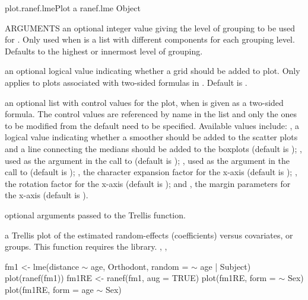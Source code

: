 \documentclass[pdftex]{article} \usepackage{url,graphicx}
\renewcommand{\Twiddle}{\mbox{\(\sim\)}}
\begin{document}
\begin{Helpfile}{plot.ranef.lme}{Plot a ranef.lme Object}
\begin{Argument}{ARGUMENTS}
an optional integer value giving the level of grouping
to be used for . Only used when  is a list
with different components for each grouping level. Defaults to the
highest or innermost level of grouping.
\item[\Co{grid:}]
an optional logical value indicating whether a grid should
be added to plot. Only applies to plots associated with two-sided
formulas in . Default is .
\item[\Co{control:}]
an optional list with control values for the
plot, when  is given as a two-sided formula. The control
values are referenced by name in the  list and  only
the ones to be modified from the default need to be
specified. Available values include: , a logical
value indicating whether a  smoother should be added to
the scatter plots and a line connecting the medians should be added
to the boxplots (default is ); , used
as the  argument in the call to 
(default is ); , used as the
 argument in the call to  (default
is ); , the character expansion factor for
the x-axis (default is ); , the rotation
factor for the x-axis (default is ); and , the
margin parameters for the x-axis (default is ).
\item[\Co{...:}]
optional arguments passed to the Trellis 
function.
\end{Argument}
a Trellis plot of the estimated random-effects (coefficients) versus
covariates, or groups.
This function requires the  library.
, ,
\need 15pt
\vspace{-16pt} 
\begin{Example}
fm1 <- lme(distance {\Twiddle} age, Orthodont, random = {\Twiddle} age | Subject)
plot(ranef(fm1))
fm1RE <- ranef(fm1, aug = TRUE)
plot(fm1RE, form = {\Twiddle} Sex)
plot(fm1RE, form = age {\Twiddle} Sex)
\end{Example}
\end{Helpfile}
\end{document}
